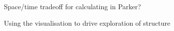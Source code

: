 \documentclass{article}
\theoremstyle{plain}
\theoremstyle{definition}
\begin{document}
Space/time tradeoff for calculating in Parker?

Using the visualisation to drive exploration of structure












\end{document}
